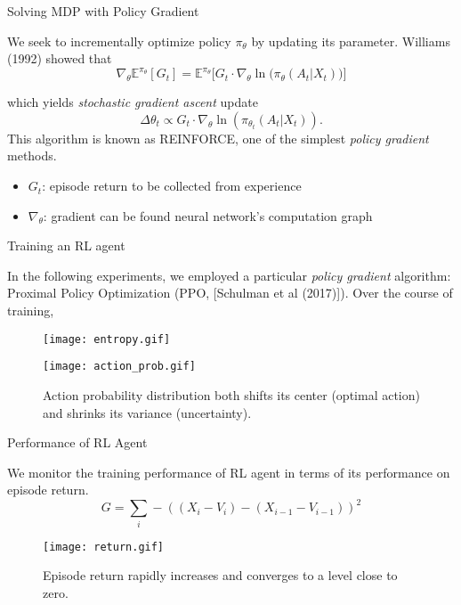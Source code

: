 \documentclass[10pt]{beamer}
\theoremstyle{definition}
\begin{document}
\begin{frame}{Solving MDP with Policy Gradient}

We seek to incrementally optimize policy $\pi_\theta$ by updating its parameter. Williams (1992) showed that
$$
\nabla_\theta \mathbb{E}^{\pi_\theta}[G_t]
    = \mathbb{E}^{\pi_\theta}\bigg[
        G_t \cdot \nabla_\theta \ln\big( \pi_\theta(A_t|X_t) \big)
    \bigg]
$$

which yields \textit{stochastic gradient ascent} update
$$
\Delta\theta_t \varpropto G_t \cdot \nabla_\theta \ln(\pi_{\theta_t}(A_t|X_t)).
$$
This algorithm is known as REINFORCE, one of the simplest \textit{policy gradient} methods.
\begin{itemize}
    \item $G_t$: episode return to be collected from experience
    \item $\nabla_\theta$: gradient can be found neural network's computation graph
\end{itemize}

\end{frame}


\begin{frame}{Training an RL agent}

In the following experiments, we employed a particular \textit{policy gradient} algorithm: Proximal Policy Optimization (PPO, [Schulman et al (2017)]). Over the course of training,

\begin{figure}
\centering
\begin{minipage}{.47\linewidth}
  \centering
  \texttt{[image: entropy.gif]}
  \caption{The RL agent is more and more certain about the optimal action to take as the entropy loss drops in training.}
  \label{fig:entropy}
\end{minipage}%
\begin{minipage}{.47\linewidth}
  \centering
  \texttt{[image: action\_prob.gif]}
  \caption{Action probability distribution both shifts its center (optimal action) and shrinks its variance (uncertainty).}
  \label{fig:action_prob}
\end{minipage}
\end{figure}

\end{frame}


\begin{frame}{Performance of RL Agent}

We monitor the training performance of RL agent in terms of its performance on episode return.
$$
G = \sum_{i} -((X_i - V_i) - (X_{i-1} - V_{i-1}))^2
$$

\begin{figure}
\centering
\texttt{[image: return.gif]}
\caption{Episode return rapidly increases and converges to a level close to zero.}
\end{figure}

\end{frame}
\end{document}
